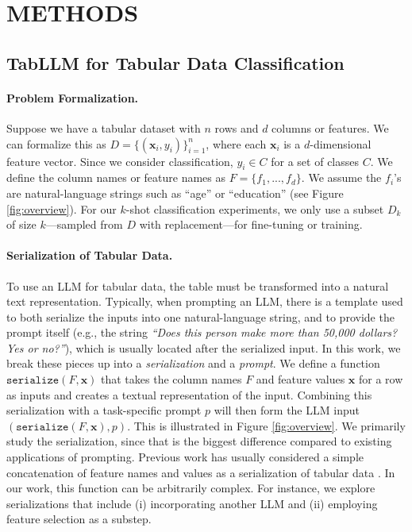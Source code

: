 \section{METHODS}

\subsection{TabLLM for Tabular Data Classification}

\paragraph{Problem Formalization.} Suppose we have a tabular dataset with $n$ rows and $d$ columns or features. We can formalize this as $D = \{(\mathbf{x}_i, y_i)\}_{i=1}^n$, where each $\mathbf{x}_i$ is a $d$-dimensional feature vector. Since we consider classification, $y_i \in C$ for a set of classes $C$. We define the column names or feature names as $F = \{f_1, ..., f_d\}$.
We assume the $f_i$'s are natural-language strings such as ``age'' or ``education'' (see Figure \ref{fig:overview}).
For our $k$-shot classification experiments, we only use a subset $D_k$ of size $k$---sampled from $D$ with replacement---for fine-tuning or training.

\paragraph{Serialization of Tabular Data.} To use an LLM for tabular data, the table must be transformed into a natural text representation. Typically, when prompting an LLM, there is a template used to both serialize the inputs into one natural-language string, and to provide the prompt itself (e.g., the string \textit{``Does this person make more than 50,000 dollars? Yes or no?''}), which is usually located after the serialized input. In this work, we break these pieces up into a \emph{serialization} and a \emph{prompt}.
We define a function $\texttt{serialize}(F, \mathbf{x})$ that takes the column names $F$ and feature values $\mathbf{x}$ for a row as inputs and creates a textual representation of the input. Combining this serialization with a task-specific prompt $p$ will then form the LLM input $(\texttt{serialize}(F, \mathbf{x}), p)$. This is illustrated in Figure \ref{fig:overview}.
We primarily study the serialization, since that is the biggest difference compared to existing applications of prompting. Previous work has usually considered a simple concatenation of feature names and values as a serialization of tabular data \citep{li_deep_2020, narayan_can_2022}. In our work, this function can be arbitrarily complex. For instance, we explore serializations that include (i) incorporating another LLM and (ii) employing feature selection as a substep.

